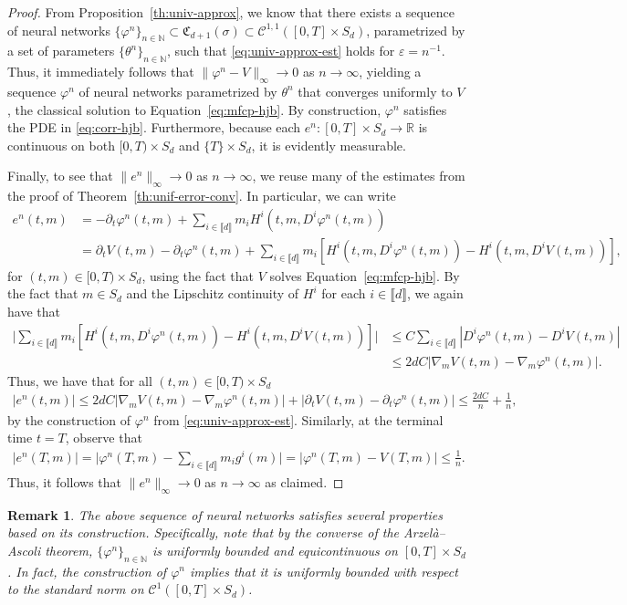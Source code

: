 \documentclass[11pt,reqno]{amsart}
\numberwithin{equation}{section}
\theoremstyle{plain}
\newtheorem{remark}[theorem]{Remark}
\newcommand{\R}{\mathbb{R}}
\newcommand{\sC}{\mathcal{C}}
\newcommand{\N}{\mathbb{N}}
\newcommand{\lbrs}[1]{\llbracket #1 \rrbracket}
\begin{document}
\begin{proof}
From Proposition~\ref{th:univ-approx}, we know that there exists a sequence of neural networks $\{\varphi^n\}_{n \in \N} \subset \mathfrak{C}_{d+1}(\sigma) \subset \sC^{1,1}([0,T] \times S_d)$, parametrized by a set of parameters $\{\theta^n\}_{n \in \N}$, such that \eqref{eq:univ-approx-est} holds for $\varepsilon = n^{-1}$. Thus, it immediately follows that $\|\varphi^n - V\|_{\infty} \to 0$ as $n \to \infty$,  yielding a sequence $\varphi^n$ of neural networks parametrized by $\theta^n$ that converges uniformly to $V$, the classical solution to Equation~\eqref{eq:mfcp-hjb}.
By construction, $\varphi^n$ satisfies the PDE in \eqref{eq:corr-hjb}. Furthermore, because each $e^n: [0,T] \times S_d \to \R$ is continuous on both $[0, T) \times S_d$ and $\{T\} \times S_d$, it is evidently measurable.

Finally, to see that $\|e^n\|_\infty \to 0$ as $n \to \infty$, we reuse many of the estimates from the proof of Theorem~\ref{th:unif-error-conv}. In particular, we can write
\begin{align*}
    e^n(t, m) &= -\partial_t \varphi^n(t, m) + \sum_{i \in \lbrs{d}} m_i H^i(t, m, D^i \varphi^n(t,m)) \\
    &= \partial_t V(t,m) -\partial_t \varphi^n(t, m) + \sum_{i \in \lbrs{d}} m_i\left[H^i(t, m, D^i \varphi^n(t,m))- H^i(t, m, D^i V(t,m))\right],
\end{align*}
for $(t,m) \in [0,T) \times S_d$, using the fact that $V$ solves Equation~\eqref{eq:mfcp-hjb}. By the fact that $m \in S_d$ and the Lipschitz continuity of $H^i$ for each $i \in \lbrs{d}$, we again have that
\begin{align*}
    \Big|\sum_{i \in \lbrs{d}} m_i\left[H^i(t, m, D^i \varphi^n(t,m))- H^i(t, m, D^i V(t,m))\right]\Big| &\leq C \sum_{i \in \lbrs{d}} |D^i \varphi^n(t, m) - D^iV(t,m)| \\
    &\leq 2 dC |\nabla_m V(t,m) - \nabla_m \varphi^n(t,m)|.
\end{align*}
Thus, we have that for all $(t,m) \in [0,T) \times S_d$
\begin{align*}
    |e^n(t,m)| \leq 2dC|\nabla_m V(t,m) - \nabla_m \varphi^n(t,m)| + |\partial_t V(t,m) -\partial_t \varphi^n(t, m)| \leq \frac{2dC}{n} + \frac{1}{n},
\end{align*}
by the construction of $\varphi^n$ from \eqref{eq:univ-approx-est}. Similarly, at the terminal time $t = T$, observe that
\begin{align*}
    |e^n(T,m)| = \Big|\varphi^n(T, m) - \sum_{i \in \lbrs{d}} m_i g^i(m)\Big| = |\varphi^n(T,m) - V(T, m)| \leq \frac{1}{n}.
\end{align*}
Thus, it follows that $\|e^n\|_{\infty} \to 0$ as $n \to \infty$ as claimed.
\end{proof}
\begin{remark}
\normalfont
The above sequence of neural networks satisfies several properties based on its construction. Specifically, note that by the converse of the Arzelà--Ascoli theorem, $\{\varphi^n\}_{n \in \N}$ is uniformly bounded and equicontinuous on $[0, T] \times S_d$. In fact, the construction of $\varphi^n$ implies that it is uniformly bounded with respect to the standard norm on $\sC^{1}([0, T] \times S_d)$.
\end{remark}
\end{document}
